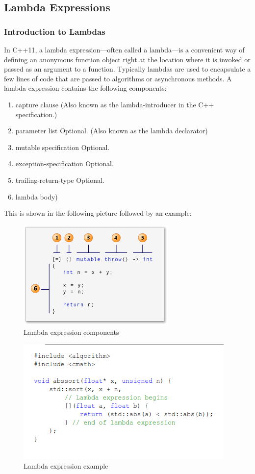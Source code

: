\subsection{Lambda Expressions}
\subsubsection{Introduction to Lambdas}
In C++11, a lambda expression—often called a lambda—is a convenient way of defining an anonymous function object right at the location where it is invoked or passed as an argument to a function. Typically lambdas are used to encapsulate a few lines of code that are passed to algorithms or asynchronous methods. A lambda expression contains the following components:
\begin{enumerate}
	\item capture clause (Also known as the lambda-introducer in the C++ specification.)
	\item parameter list Optional. (Also known as the lambda declarator)
	\item mutable specification Optional.
	\item exception-specification Optional.
	\item trailing-return-type Optional.
	\item lambda body)
\end{enumerate}
This is shown in the following picture followed by an example:
\begin{figure}[H]
	\centering
	\includegraphics{images/lambda_components.png}
	\caption{Lambda expression components}
\end{figure}
\begin{figure}[H]
	\centering
	\includegraphics{images/lambda_example.png}
	\caption{Lambda expression example}
\end{figure}
